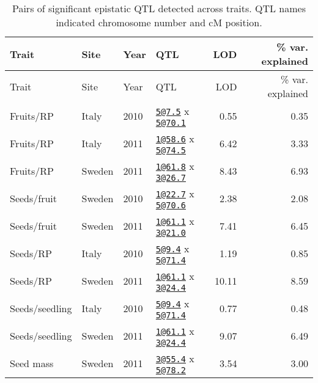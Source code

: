 \documentclass[]{article}
\begin{document}
\newpage

\begin{longtable}[]{@{}llllrr@{}}
\caption{\label{tab:epistatic-qtl-table}Pairs of significant epistatic QTL detected across traits. QTL names indicated chromosome number and cM position.}\tabularnewline
\toprule
Trait & Site & Year & QTL & LOD & \% var. explained\tabularnewline
\midrule
\endfirsthead
\toprule
Trait & Site & Year & QTL & LOD & \% var. explained\tabularnewline
\midrule
\endhead
Fruits/RP & Italy & 2010 & \href{mailto:5@7.5}{\nolinkurl{5@7.5}} x \href{mailto:5@70.1}{\nolinkurl{5@70.1}} & 0.55 & 0.35\tabularnewline
Fruits/RP & Italy & 2011 & \href{mailto:1@58.6}{\nolinkurl{1@58.6}} x \href{mailto:5@74.5}{\nolinkurl{5@74.5}} & 6.42 & 3.33\tabularnewline
Fruits/RP & Sweden & 2011 & \href{mailto:1@61.8}{\nolinkurl{1@61.8}} x \href{mailto:3@26.7}{\nolinkurl{3@26.7}} & 8.43 & 6.93\tabularnewline
Seeds/fruit & Sweden & 2010 & \href{mailto:1@22.7}{\nolinkurl{1@22.7}} x \href{mailto:5@70.6}{\nolinkurl{5@70.6}} & 2.38 & 2.08\tabularnewline
Seeds/fruit & Sweden & 2011 & \href{mailto:1@61.1}{\nolinkurl{1@61.1}} x \href{mailto:3@21.0}{\nolinkurl{3@21.0}} & 7.41 & 6.45\tabularnewline
Seeds/RP & Italy & 2010 & \href{mailto:5@9.4}{\nolinkurl{5@9.4}} x \href{mailto:5@71.4}{\nolinkurl{5@71.4}} & 1.19 & 0.85\tabularnewline
Seeds/RP & Sweden & 2011 & \href{mailto:1@61.1}{\nolinkurl{1@61.1}} x \href{mailto:3@24.4}{\nolinkurl{3@24.4}} & 10.11 & 8.59\tabularnewline
Seeds/seedling & Italy & 2010 & \href{mailto:5@9.4}{\nolinkurl{5@9.4}} x \href{mailto:5@71.4}{\nolinkurl{5@71.4}} & 0.77 & 0.48\tabularnewline
Seeds/seedling & Sweden & 2011 & \href{mailto:1@61.1}{\nolinkurl{1@61.1}} x \href{mailto:3@24.4}{\nolinkurl{3@24.4}} & 9.07 & 6.49\tabularnewline
Seed mass & Sweden & 2011 & \href{mailto:3@55.4}{\nolinkurl{3@55.4}} x \href{mailto:5@78.2}{\nolinkurl{5@78.2}} & 3.54 & 3.00\tabularnewline
\bottomrule
\end{longtable}

\newpage
\end{document}
